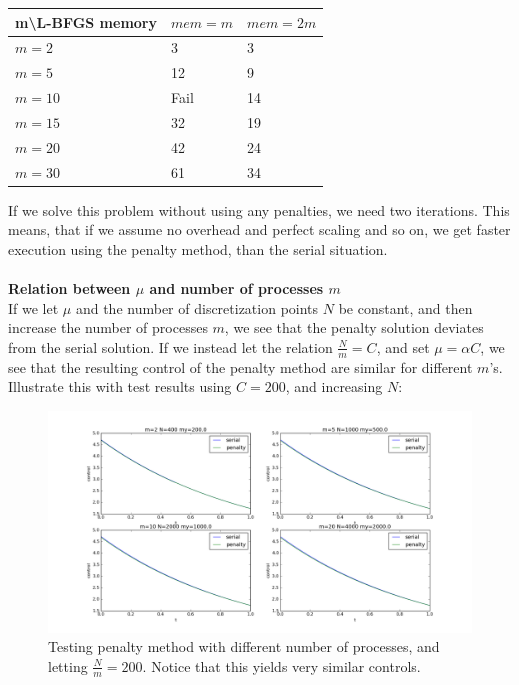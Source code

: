 \documentclass[11pt,a4paper]{report}
\begin{document}
\begin{center}
    \begin{tabular}{| l | l | l |}
    \hline
    m\textbackslash L-BFGS memory & $mem=m$& $mem=2m$ \\ \hline
    $m=2$  &  3 & 3 \\ \hline
    $m=5$  &  12 &  9	\\ \hline
    $m=10$ &  Fail & 14 \\ \hline
    $m=15$ &  32 &  19	\\ \hline
    $m=20$ &  42 & 24 \\ \hline
    $m=30$ &  61 &  34	\\ \hline
    \end{tabular}
\end{center}
If we solve this problem without using any penalties, we need two iterations. This means, that if we assume no overhead and perfect scaling and so on, we get faster execution using the penalty method, than the serial situation.
\\
\\
\textbf{Relation between $\mu$ and number of processes $m$}
\\
If we let $\mu$ and the number of discretization points $N$ be constant, and then increase the number of processes $m$, we see that the penalty solution deviates from the serial solution. If we instead let the relation $\frac{N}{m}=C$, and set $\mu = \alpha C$, we see that the resulting control of the penalty method are similar for different $m$'s. Illustrate this with test results using $C=200$, and increasing $N$:
\begin{figure}
  \includegraphics[width=\linewidth]{Mu_mRelation.png}
  \caption{Testing penalty method with different number of processes, and letting $\frac{N}{m}=200$. Notice that this yields very similar controls. }
  \label{Fig 3}
\end{figure}
\end{document}
